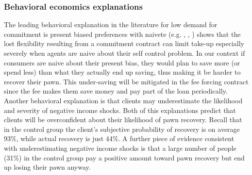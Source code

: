 \documentclass[11pt]{article}
\begin{document}
\subsubsection{Behavioral economics explanations} \label{behavioral}

The leading behavioral explanation in the literature for low demand for commitment is present biased preferences with naivete (e.g. \cite{Rabin2018}, \cite{John}, \cite{Laibson2018})  \cite{Laibson2015} shows that the lost flexibility resulting from a commitment contract can limit take-up especially severely when agents are naive about their self control problem. In our context if consumers are naive about their present bias, they would plan to save more (or spend less) than what they actually end up saving, thus making it be harder to recover their pawn. This under-saving will be mitigated in the fee forcing contract since the fee makes them save money and pay part of the loan periodically. Another behavioral explanation is that clients may underestimate the likelihood and severity of negative income shocks. Both of this explanations predict that clients will be overconfident about their likelihood of pawn recovery. Recall that in the control group the client's subjective probability of recovery is on average 93\%, while actual recovery is just 44\%. A further piece of evidence consistent with underestimating negative income shocks is that a large number of people (31\%) in the control group pay a positive amount toward pawn recovery but end up losing their pawn anyway.
\end{document}
